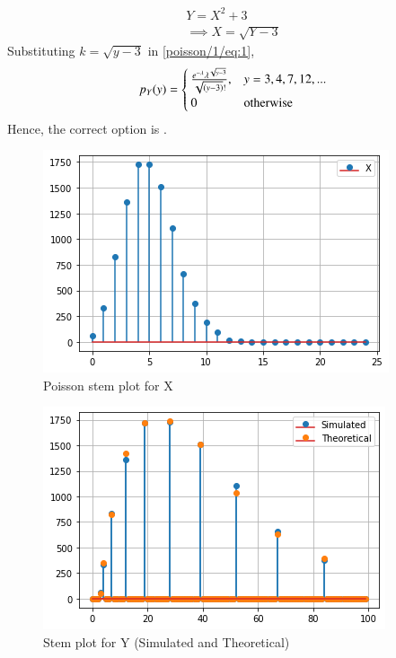 %
\begin{align}
    Y = X^2 + 3\\
\implies     X = \sqrt{Y - 3}
\end{align}
Substituting $k = \sqrt{y-3}$ in \eqref{poisson/1/eq:1},
\begin{align}
p_Y(y) = 
    \begin{cases} 
      \frac{e^{-\lambda}\lambda^{\sqrt{y-3}}}{\sqrt{\left(y-3\right)}!}, & y=3,4,7,12,...\\
      0&\text{otherwise}
   \end{cases}
\end{align}
Hence, the correct option is .
\begin{figure}[hb]
    \centering
    \includegraphics[width=\columnwidth]{poisson/solutions/1/Figures/FigureX.png}
    \caption{Poisson stem plot for X }
    \label{poisson/1/fig:plot1}
\end{figure}
\begin{figure}[hb]
    \centering
    \includegraphics[width=\columnwidth]{poisson/solutions/1/Figures/FigureComp.png}
    \caption{Stem plot for Y (Simulated and Theoretical) }
    \label{poisson/1/fig:plot3}
\end{figure}

